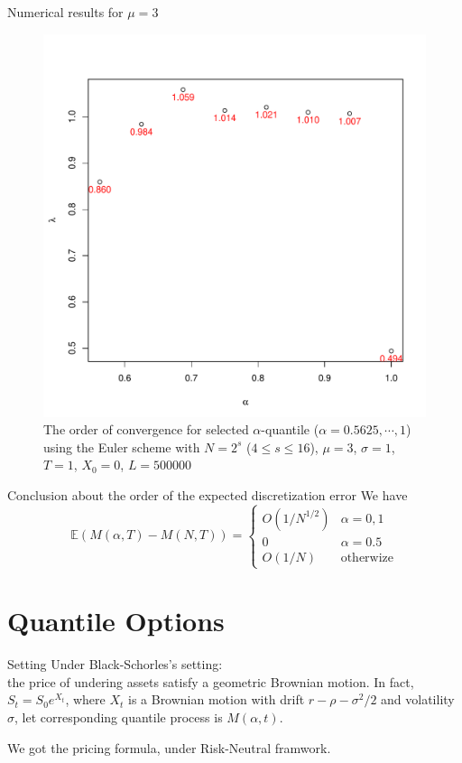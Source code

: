 \documentclass[cjk,10pt]{beamer}
\begin{document}
\begin{frame}{Numerical results for $\mu=3$}
\begin{figure}[p]
   \centering
   \includegraphics[scale=0.3]{nout_4_25_3rato.pdf} %
   \caption{The order of convergence for selected $\alpha$-quantile ($\alpha = 0.5625, \cdots, 1$) using the Euler scheme with $N = 2^s$ ($4\le s \le 16$), $\mu=3$, $\sigma=1$, $T=1$, $X_0=0$, $L=500000$}
   \label{f:rate3}
\end{figure}
\end{frame}

\begin{frame}{Conclusion about the order of the expected discretization error}
We have 
\[
\mathbb{E}\left( M(\alpha, T) - M(N,T)\right) 
= 
\begin{cases}
O(1/N^{1/2}) & \alpha=0,1\\
0 & \alpha=0.5\\
O(1/N) & \text{otherwize}
\end{cases} 
\]
\end{frame}

\section{Quantile Options}
\begin{frame}{Setting}
Under Black-Schorles's setting:\\
the price of undering assets 
satisfy a geometric Brownian motion. 
In fact, $S_t= S_0 e^{X_t}$, 
where $X_t$ is a Brownian motion with drift $r-\rho-\sigma^2/2$ 
and volatility $\sigma$,
let corresponding quantile process is 
$M(\alpha, t)$. 

We got the pricing formula, under Risk-Neutral framwork.
\end{frame}
\end{document}
